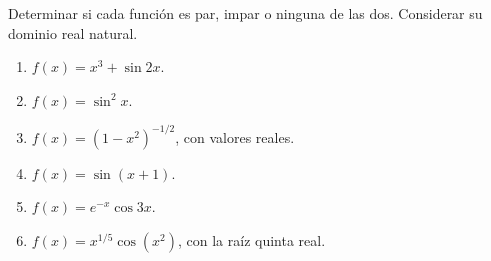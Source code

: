 Determinar si cada función es par, impar o ninguna de las dos. Considerar su dominio real natural.

\begin{enumerate}[label=(\alph*),ref=\alph*,leftmargin=*]
\item \(f(x)=x^3+\sin2x\).
\item \(f(x)=\sin^2x\).
\item \(f(x)=(1-x^2)^{-1/2}\), con valores reales.
\item \(f(x)=\sin(x+1)\).
\item \(f(x)=e^{-x}\cos3x\).
\item \(f(x)=x^{1/5}\cos(x^2)\), con la raíz quinta real.
\end{enumerate}
